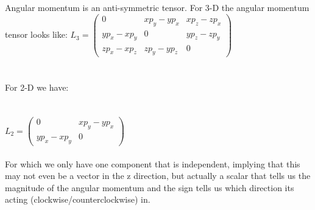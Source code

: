 \documentclass[fleqn]{article}
\begin{document}
\begin{enumerate}
\begin{itemize}
        \textcolor{hwColor}{
          \\
          \\
          Angular momentum is an anti-symmetric tensor. For 3-D the angular momentum tensor looks like:
          $
            L_3=\begin{pmatrix}
              0 & xp_y-yp_x & xp_z-zp_x
              \\
              yp_x-xp_y & 0 & yp_z-zp_y 
              \\
              zp_x-xp_z & zp_y-yp_z & 0
            \end{pmatrix}
          $ 
          \\
          \\
          \\
          For 2-D we have: \\
          \\
          \\
          $
            L_2=\begin{pmatrix}
              0 & xp_y-yp_x
              \\
              yp_x-xp_y & 0 
            \end{pmatrix}
          $
          \\
          \\
          For which we only have one component that is independent, implying that this may not even be a vector in
          the z direction, but actually a scalar that tells us the magnitude of the angular momentum and the sign 
          tells us which direction its acting (clockwise/counterclockwise) in.
        }

    \end{itemize}
    
  \end{enumerate}
\end{document}
